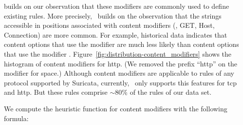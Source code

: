 \documentclass[sigconf,review, anonymous]{acmart}
\begin{document}


\tname{} builds on our observation that these modifiers are commonly
used to define existing rules. More precisely, \tname\ builds on the
observation that the strings accessible in positions associated with
content modifiers (\eg{}, GET, Host, Connection) are more common. For
example, historical data indicates that content options that use the
modifier  are much less likely than content
options that use the modifier
. Figure~\ref{fig:distribution-content_modifiers}
shows the histogram of content modifiers for http. (We removed the
prefix ``http'' on the modifier for space.) Although content modifiers
are applicable to rules of any protocol supported by Suricata,
currently, \tname\ only supports this features for tcp and http. But
these rules comprise $\sim$80\% of the rules of our data set.



We compute the heuristic function for content modifiers with the
following formula:
\end{document}
